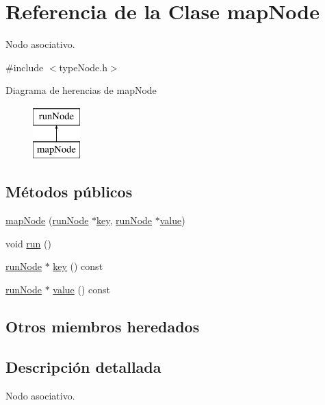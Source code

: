 \hypertarget{classmapNode}{\section{Referencia de la Clase map\-Node}
\label{classmapNode}
}


Nodo asociativo.  




{\ttfamily \#include $<$type\-Node.\-h$>$}

Diagrama de herencias de map\-Node\begin{figure}[H]
\begin{center}
\leavevmode
\includegraphics[height=2.000000cm]{classmapNode}
\end{center}
\end{figure}
\subsection*{Métodos públicos}
\begin{DoxyCompactItemize}
\item 
\hyperlink{classmapNode_ab0d7cb0e0ba1830fa5da64012b72ce51}{map\-Node} (\hyperlink{classrunNode}{run\-Node} $\ast$\hyperlink{classmapNode_a8339011bfd62dfd948820685d66bd76f}{key}, \hyperlink{classrunNode}{run\-Node} $\ast$\hyperlink{classmapNode_aee0e510a490ec243233aef686e36ba9d}{value})
\item 
void \hyperlink{classmapNode_a4952ccc82274599b547f73ea5743ec27}{run} ()
\item 
\hyperlink{classrunNode}{run\-Node} $\ast$ \hyperlink{classmapNode_a8339011bfd62dfd948820685d66bd76f}{key} () const 
\item 
\hyperlink{classrunNode}{run\-Node} $\ast$ \hyperlink{classmapNode_aee0e510a490ec243233aef686e36ba9d}{value} () const 
\end{DoxyCompactItemize}
\subsection*{Otros miembros heredados}


\subsection{Descripción detallada}
Nodo asociativo. 

